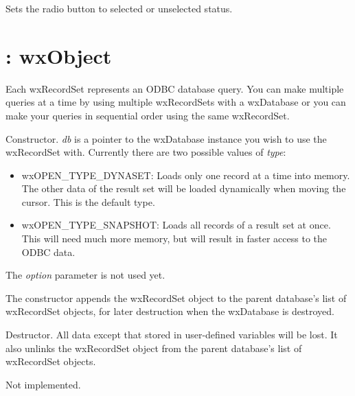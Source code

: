 Sets the radio button to selected or unselected status.


\section{: wxObject}\label{wxrecordset}


Each wxRecordSet represents an ODBC database query. You can make multiple queries
at a time by using multiple wxRecordSets with a wxDatabase or you can make
your queries in sequential order using the same wxRecordSet.



Constructor. {\it db} is a pointer to the wxDatabase instance you wish to use the
wxRecordSet with. Currently there are two possible values of {\it type}:

\begin{itemize}\itemsep=0pt
\item wxOPEN\_TYPE\_DYNASET: Loads only one record at a time into memory. The other
data of the result set will be loaded dynamically when
moving the cursor. This is the default type.
\item wxOPEN\_TYPE\_SNAPSHOT: Loads all records of a result set at once. This will
need much more memory, but will result in
faster access to the ODBC data.
\end{itemize}

The {\it option} parameter is not used yet.

The constructor appends the wxRecordSet object to the parent database's list of
wxRecordSet objects, for later destruction when the wxDatabase is destroyed.



Destructor. All data except that stored in user-defined variables will be lost.
It also unlinks the wxRecordSet object from the parent database's list of
wxRecordSet objects.
 


Not implemented.

